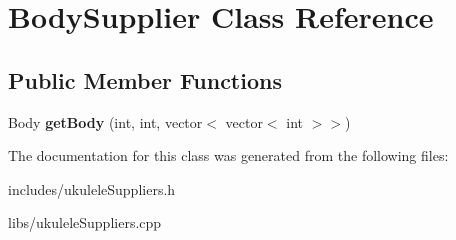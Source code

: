 \hypertarget{class_body_supplier}{}\section{Body\+Supplier Class Reference}
\label{class_body_supplier}
\subsection*{Public Member Functions}
\begin{DoxyCompactItemize}
\item 
\hypertarget{class_body_supplier_a3c3824fc1d3359cf78e434653405027f}{}\label{class_body_supplier_a3c3824fc1d3359cf78e434653405027f} 
Body {\bfseries get\+Body} (int, int, vector$<$ vector$<$ int $>$$>$)
\end{DoxyCompactItemize}


The documentation for this class was generated from the following files\+:\begin{DoxyCompactItemize}
\item 
includes/ukulele\+Suppliers.\+h\item 
libs/ukulele\+Suppliers.\+cpp\end{DoxyCompactItemize}
